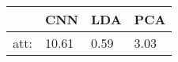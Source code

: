 \begin{tabular}{|r|l|l|l|}
  \hline
    & CNN & LDA & PCA \\
  \hline
  att: & 10.61 & 0.59 & 3.03 \\
  \hline
\end{tabular}
